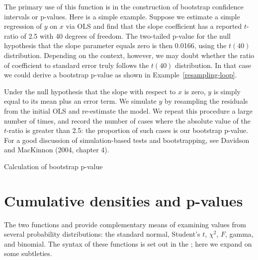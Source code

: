 The primary use of this function is in the construction of bootstrap
confidence intervals or p-values.  Here is a simple example.  Suppose
we estimate a simple regression of $y$ on $x$ via OLS and find that
the slope coefficient has a reported $t$-ratio of 2.5 with 40 degrees
of freedom.  The two-tailed p-value for the null hypothesis that the
slope parameter equals zero is then 0.0166, using the $t(40)$
distribution.  Depending on the context, however, we may doubt whether
the ratio of coefficient to standard error truly follows the $t(40)$
distribution.  In that case we could derive a bootstrap p-value as
shown in Example~\ref{resampling-loop}.  

Under the null hypothesis that the slope with respect to $x$ is zero,
$y$ is simply equal to its mean plus an error term.  We simulate $y$
by resampling the residuals from the initial OLS and re-estimate the
model.  We repeat this procedure a large number of times, and record
the number of cases where the absolute value of the $t$-ratio is
greater than 2.5: the proportion of such cases is our bootstrap
p-value.  For a good discussion of simulation-based tests and
bootstrapping, see Davidson and MacKinnon (2004, chapter 4).

\begin{script}[htbp]
  \caption{Calculation of bootstrap p-value}
  \label{resampling-loop}
\end{script}

\section{Cumulative densities and p-values}
\label{genr-cdf}

The two functions  and  provide complementary
means of examining values from several probability distributions: the
standard normal, Student's $t$, $\chi^2$, $F$, gamma, and binomial.
The syntax of these functions is set out in the \GCR; here we expand
on some subtleties.

